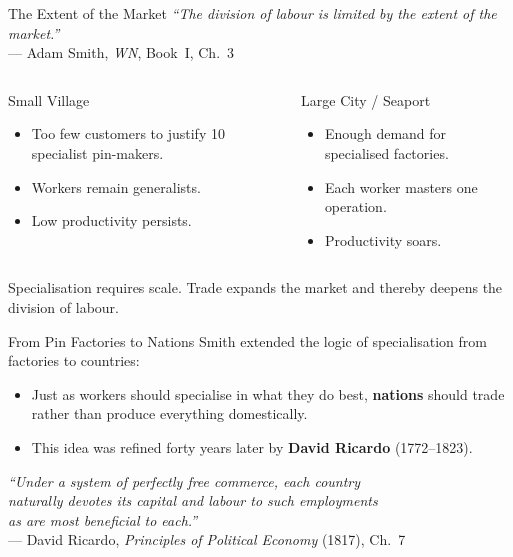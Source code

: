 \documentclass[aspectratio=169, 10pt]{beamer}
\begin{document}
\begin{frame}{The Extent of the Market}
\textit{``The division of labour is limited by the extent of the market.''}\\
\hfill --- Adam Smith, \textit{WN}, Book~I, Ch.~3
\vspace{1em}
\begin{columns}[T]
\begin{block}{Small Village}
  \begin{itemize}
    \item Too few customers to justify 10 specialist pin-makers.
    \item Workers remain generalists.
    \item Low productivity persists.
  \end{itemize}
\end{block}
\begin{block}{Large City / Seaport}
  \begin{itemize}
    \item Enough demand for specialised factories.
    \item Each worker masters one operation.
    \item Productivity soars.
  \end{itemize}
\end{block}
\end{columns}
\vspace{0.5em}
Specialisation requires \alert{scale}. Trade expands the market
and thereby deepens the division of labour.
\end{frame}

\begin{frame}{From Pin Factories to Nations}
Smith extended the logic of specialisation from factories to countries:
\vspace{0.5em}
\begin{itemize}
  \item Just as workers should specialise in what they do best,
        \textbf{nations} should trade rather than produce everything domestically.
  \item This idea was refined forty years later by \textbf{David Ricardo}
        (1772--1823).
\end{itemize}
\vspace{0.5em}
\begin{center}
\textit{``Under a system of perfectly free commerce, each country\\
naturally devotes its capital and labour to such employments\\
as are most beneficial to each.''}\\[4pt]
--- David Ricardo, \textit{Principles of Political Economy} (1817), Ch.~7
\end{center}
\end{frame}
\end{document}
